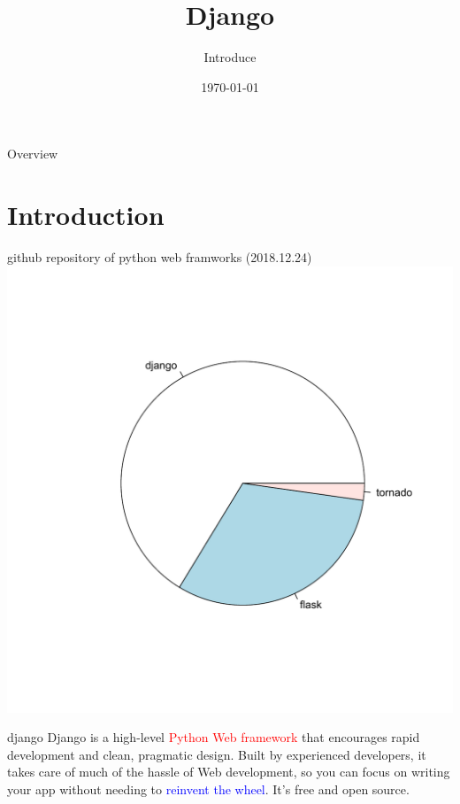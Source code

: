 \documentclass{beamer}
\title[Django]{Django} %
\subtitle{Introduce}
\author{} %
\institute[计算机科学与技术学院] %
{
贵州大学 \\ %
\medskip
\textit{hnzhang1@gzu.edu.cn} %
}
\date{\today} %
\begin{document}
\begin{frame}
\titlepage %
\end{frame}
\begin{frame}{Overview}
\tableofcontents
\end{frame}
\section{Introduction}
\begin{frame}{github repository of python web framworks (2018.12.24)}
\includegraphics[height=1\textheight]{django-introduce-1.pdf}
\end{frame}
\begin{frame}{django}
Django is a high-level \textcolor{red}{Python Web framework} that encourages rapid development and clean, pragmatic design. Built by experienced developers, it takes care of much of the hassle of Web development, so you can focus on writing your app without needing to \textcolor{blue}{reinvent the wheel}. It’s free and open source. 
\end{frame}
\end{document}
